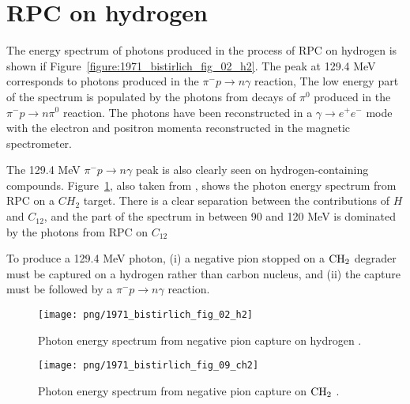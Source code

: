 


\section{RPC on hydrogen}

The energy spectrum of photons produced in the process of RPC on hydrogen \cite{RPC_1972_Bistirlich_PhysRevC.5.1867} is shown if Figure~\ref{figure:1971_bistirlich_fig_02_h2}.
The peak at 129.4 MeV corresponds to photons produced in the $\pi^- p \to n \gamma$ reaction,
  The low energy part of the spectrum is populated by the photons from decays of $\pi^0$ produced
  in the $\pi^- p \to n \pi^0$ reaction. The photons have been reconstructed in a $\gamma \to e^+e^-$
  mode with the electron and positron momenta reconstructed in the magnetic spectrometer.

The 129.4 MeV $\pi^{-} p \to n \gamma$ peak is also clearly seen on hydrogen-containing compounds.
  Figure~\ref{figure:1971_bistirlich_fig_09_ch2}, also taken from \cite{RPC_1972_Bistirlich_PhysRevC.5.1867},
  shows the photon energy spectrum from RPC on a $CH_2$ target.
  There is a clear separation between the contributions of $H$ and $C_{12}$,
  and the part of the spectrum in between 90 and 120 MeV is dominated by the photons from RPC on $C_{12}$

To produce a 129.4 MeV photon, (i) a negative pion stopped on a $\rm{CH_2}$  degrader must be captured on a hydrogen rather
than carbon nucleus, and (ii) the capture must be followed by a $\pi^{-} p \to n \gamma$ reaction.


\begin{figure}[H]
 \begin{minipage}{.5\textwidth}
  \texttt{[image: png/1971\_bistirlich\_fig\_02\_h2]}
  \captionsetup{width=.8\linewidth}
  \caption[width=0.9\textwidth]{
      \label{figure:1971_bistirlich_fig_02_h2}
    Photon energy spectrum from negative pion capture on hydrogen \cite{RPC_1972_Bistirlich_PhysRevC.5.1867}.
    }
 \end{minipage}
 \begin{minipage}{.5\textwidth}
  \texttt{[image: png/1971\_bistirlich\_fig\_09\_ch2]}
  \captionsetup{width=.8\linewidth}
  \caption[width=0.9\textwidth]{
  \label{figure:1971_bistirlich_fig_09_ch2}
    Photon energy spectrum from negative pion capture on $\rm{CH_2}$ \cite{RPC_1972_Bistirlich_PhysRevC.5.1867}.
   }
 \end{minipage}
\end{figure}

